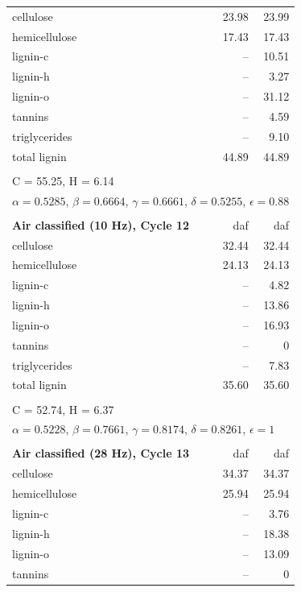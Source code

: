 \documentclass[12pt,titlepage]{article}
\begin{document}
\begin{longtable}{p{8cm}rr}
    \midrule
    cellulose     & 23.98 & 23.99 \\
    hemicellulose & 17.43 & 17.43 \\
    lignin-c      & --    & 10.51 \\
    lignin-h      & --    & 3.27 \\
    lignin-o      & --    & 31.12 \\
    tannins       & --    & 4.59 \\
    triglycerides & --    & 9.10 \\
    total lignin  & 44.89 & 44.89 \\
    \\
    \multicolumn{3}{l}{C = 55.25, H = 6.14} \\
    \multicolumn{3}{l}{$\alpha = 0.5285$, $\beta = 0.6664$, $\gamma = 0.6661$, $\delta = 0.5255$, $\epsilon = 0.88$} \\
    \\
    \textbf{Air classified (10 Hz), Cycle 12} & daf & daf \\
    \midrule
    cellulose     & 32.44 & 32.44 \\
    hemicellulose & 24.13 & 24.13 \\
    lignin-c      & --    & 4.82 \\
    lignin-h      & --    & 13.86 \\
    lignin-o      & --    & 16.93 \\
    tannins       & --    & 0 \\
    triglycerides & --    & 7.83 \\
    total lignin  & 35.60 & 35.60 \\
    \\
    \multicolumn{3}{l}{C = 52.74, H = 6.37} \\
    \multicolumn{3}{l}{$\alpha = 0.5228$, $\beta = 0.7661$, $\gamma = 0.8174$, $\delta = 0.8261$, $\epsilon = 1$} \\
    \\
    \textbf{Air classified (28 Hz), Cycle 13} & daf & daf \\
    \midrule
    cellulose     & 34.37 & 34.37 \\
    hemicellulose & 25.94 & 25.94 \\
    lignin-c      & --    & 3.76 \\
    lignin-h      & --    & 18.38 \\
    lignin-o      & --    & 13.09 \\
    tannins       & --    & 0 \\

\end{longtable}
\end{document}
